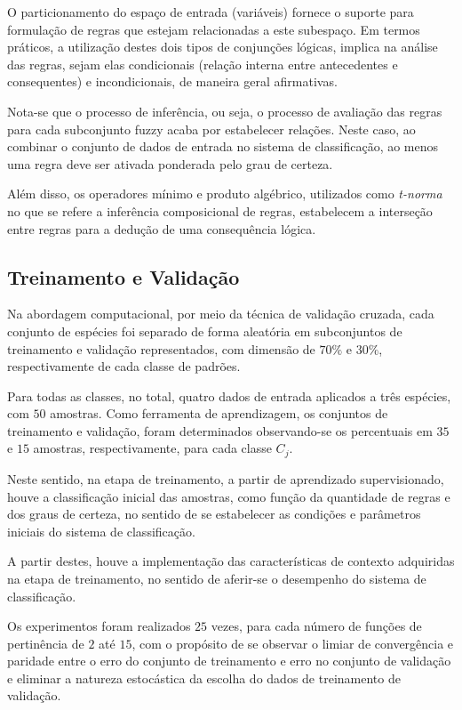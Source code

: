 \documentclass[12pt,a4paper]{article}
\numberwithin{equation}{section}
\begin{document}
O particionamento do espaço de entrada (variáveis) fornece o suporte para formulação de regras que estejam relacionadas a este subespaço. Em termos práticos, a utilização destes dois tipos de conjunções lógicas, implica na análise das regras, sejam elas condicionais (relação interna entre antecedentes e consequentes) e incondicionais, de maneira geral afirmativas. 

Nota-se que o processo de inferência, ou seja, o processo de avaliação das regras para cada subconjunto fuzzy acaba por estabelecer relações. Neste caso, ao combinar o conjunto de dados de entrada no sistema de classificação, ao menos uma regra deve ser ativada ponderada pelo grau de certeza.

Além disso, os operadores mínimo e produto algébrico, utilizados como \textit{t-norma} no que se refere a inferência composicional de regras, estabelecem a interseção entre regras para a dedução de uma consequência lógica.

\subsection{Treinamento e Validação}
\label{subsection:training}

Na abordagem computacional, por meio da técnica de validação cruzada, cada conjunto de espécies foi separado de forma aleatória em subconjuntos de treinamento e validação representados, com dimensão de $70\%$ e $30\%$, respectivamente de cada classe de padrões.

Para todas as classes, no total, quatro dados de entrada aplicados a três espécies, com $50$ amostras. Como ferramenta de aprendizagem, os conjuntos de treinamento e validação, foram determinados observando-se os percentuais em $35$ e $15$ amostras, respectivamente, para cada classe $C_{j}$.

Neste sentido, na etapa de treinamento, a partir de aprendizado supervisionado, houve a classificação inicial das amostras, como função da quantidade de regras e dos graus de certeza, no sentido de se estabelecer as condições e parâmetros iniciais do sistema de classificação.

A partir destes, houve a implementação das características de contexto adquiridas na etapa de treinamento, no sentido de aferir-se o desempenho do sistema de classificação.

Os experimentos foram realizados $25$ vezes, para cada número de funções de pertinência de $2$ até $15$, com o propósito de se observar o limiar de convergência e paridade entre o erro do conjunto de treinamento e erro no conjunto de validação e eliminar a natureza estocástica da escolha do dados de treinamento de validação.
\end{document}
